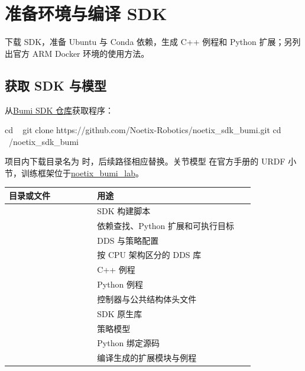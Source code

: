 \chapter{准备环境与编译 SDK}

\begin{intro}
下载 SDK，准备 Ubuntu 与 Conda 依赖，生成 C++ 例程和 Python 扩展；另列出官方 ARM Docker 环境的使用方法。
\end{intro}
\section{获取 SDK 与模型}
从\href{https://github.com/Noetix-Robotics/noetix_sdk_bumi}{Bumi SDK 仓库}获取程序：
\par\noindent\begin{minipage}{\linewidth}
\begin{command}
cd ~
git clone https://github.com/Noetix-Robotics/noetix_sdk_bumi.git
cd ~/noetix_sdk_bumi
\end{command}
\end{minipage}\par

项目内下载目录名为  时，后续路径相应替换。关节模型  在官方手册的 URDF 小节，训练框架位于\href{https://github.com/Noetix-Robotics/noetix_bumi_lab}{noetix\_bumi\_lab}。

\begingroup\small\renewcommand{\arraystretch}{1.15}
\begin{longtable}{@{}P{0.33\linewidth}P{0.59\linewidth}@{}}
\toprule
\textbf{目录或文件} & \textbf{用途} \\
\midrule\endhead
{} & SDK 构建脚本 \\
 & 依赖查找、Python 扩展和可执行目标 \\
 & DDS 与策略配置 \\
 & 按 CPU 架构区分的 DDS 库 \\
 & C++ 例程 \\
 & Python 例程 \\
 & 控制器与公共结构体头文件 \\
 & SDK 原生库 \\
 & 策略模型 \\
 & Python 绑定源码 \\
 & 编译生成的扩展模块与例程 \\
\bottomrule\end{longtable}\endgroup

